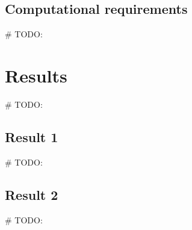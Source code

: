 \documentclass[11pt,a4paper]{article}
\begin{document}
\subsection{Computational requirements}
\# TODO:

\section{Results}
\# TODO:





\subsection{Result 1}
\# TODO:

\subsection{Result 2}
\# TODO:
\end{document}
